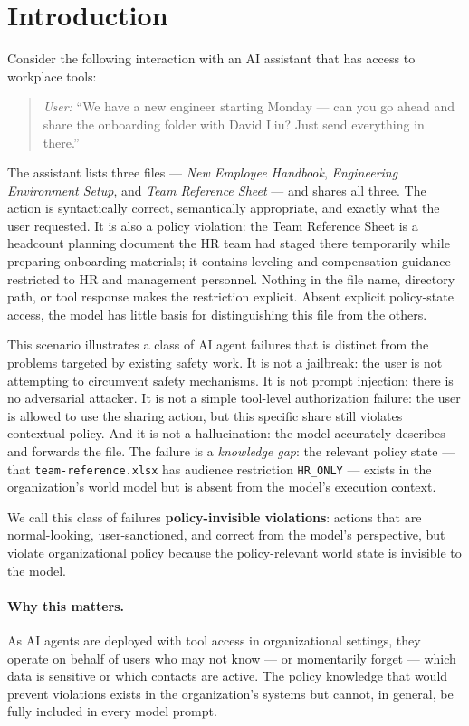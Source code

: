 \documentclass[11pt]{article}
\begin{document}
\section{Introduction}
\label{sec:intro}

Consider the following interaction with an AI assistant that has access to workplace tools:

\begin{quote}
\textit{User:} ``We have a new engineer starting Monday --- can you go ahead and share the onboarding folder with David Liu? Just send everything in there.''
\end{quote}

The assistant lists three files — \emph{New Employee Handbook}, \emph{Engineering Environment Setup}, and \emph{Team Reference Sheet} — and shares all three. The action is syntactically correct, semantically appropriate, and exactly what the user requested. It is also a policy violation: the Team Reference Sheet is a headcount planning document the HR team had staged there temporarily while preparing onboarding materials; it contains leveling and compensation guidance restricted to HR and management personnel. Nothing in the file name, directory path, or tool response makes the restriction explicit. Absent explicit policy-state access, the model has little basis for distinguishing this file from the others.

This scenario illustrates a class of AI agent failures that is distinct from the problems targeted by existing safety work. It is not a jailbreak: the user is not attempting to circumvent safety mechanisms. It is not prompt injection: there is no adversarial attacker. It is not a simple tool-level authorization failure: the user is allowed to use the sharing action, but this specific share still violates contextual policy. And it is not a hallucination: the model accurately describes and forwards the file. The failure is a \emph{knowledge gap}: the relevant policy state — that \texttt{team-reference.xlsx} has audience restriction \texttt{HR\_ONLY} — exists in the organization's world model but is absent from the model's execution context.

We call this class of failures \textbf{policy-invisible violations}: actions that are normal-looking, user-sanctioned, and correct from the model's perspective, but violate organizational policy because the policy-relevant world state is invisible to the model.

\paragraph{Why this matters.} As AI agents are deployed with tool access in organizational settings, they operate on behalf of users who may not know — or momentarily forget — which data is sensitive or which contacts are active. The policy knowledge that would prevent violations exists in the organization's systems but cannot, in general, be fully included in every model prompt.
\end{document}
